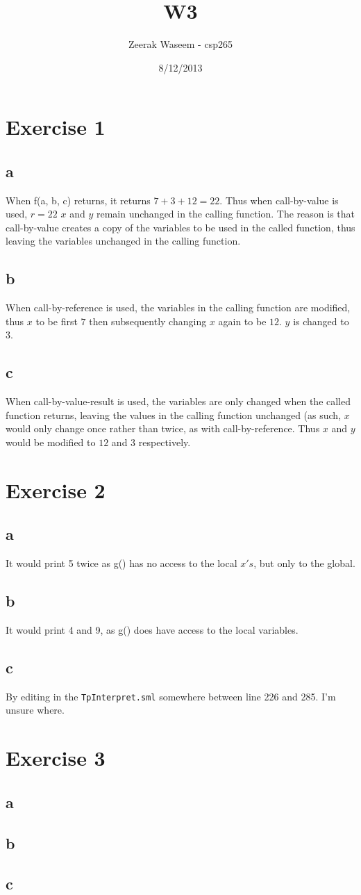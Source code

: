 \documentclass{article}
\title{W3}
\author{Zeerak Waseem - csp265}
\date{8/12/2013}
\begin{document}
\maketitle
\newpage

\section{Exercise 1}

\subsection{a}
When f(a, b, c) returns, it returns \(7 + 3 + 12 = 22\). Thus when call-by-value is used, \(r = 22\) \(x\) and \(y\) remain unchanged in the calling function. The reason is that call-by-value creates a copy of the variables to be used in the called function, thus leaving the variables unchanged in the calling function.
\subsection{b}
When call-by-reference is used, the variables in the calling function are modified, thus \(x\) to be first \(7\) then subsequently changing \(x\) again to be \(12\). \(y\) is changed to \(3\).
\subsection{c}
When call-by-value-result is used, the variables are only changed when the called function returns, leaving the values in the calling function unchanged (as such, \(x\) would only change once rather than twice, as with call-by-reference. Thus \(x\) and \(y\) would be modified to \(12\) and \(3\) respectively.

\section{Exercise 2}
\subsection{a}
It would print 5 twice as g() has no access to the local \(x's\), but only to the global.
\subsection{b}
It would print 4 and 9, as g() does have access to the local variables.
\subsection{c}
By editing in the \texttt{TpInterpret.sml} somewhere between line 226 and 285. I'm unsure where.

\section{Exercise 3}
\subsection{a}
\subsection{b}
\subsection{c}
\end{document}
